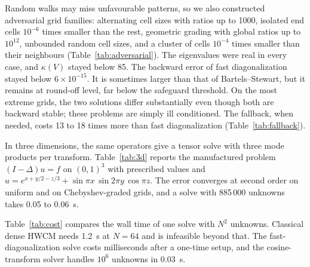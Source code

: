 \documentclass[preprint,12pt]{elsarticle}
\theoremstyle{remark}
\begin{document}
Random walks may miss unfavourable patterns, so we also constructed adversarial grid families:
alternating cell sizes with ratios up to 1000, isolated end cells $10^{-6}$ times smaller than the rest,
geometric grading with global ratios up to $10^{12}$, unbounded random cell sizes, and a cluster of cells
$10^{-4}$ times smaller than their neighbours (Table~\ref{tab:adversarial}). The eigenvalues were real in
every case, and $\kappa(V)$ stayed below 85. The backward error of fast diagonalization stayed below
$6\times10^{-15}$. It is sometimes larger than that of Bartels--Stewart, but it remains at round-off level,
far below the safeguard threshold. On the most extreme grids, the two solutions differ substantially even
though both are backward stable; these problems are simply ill conditioned. The fallback, when needed,
costs 13 to 18 times more than fast diagonalization (Table~\ref{tab:fallback}).

\begin{table}[t]\centering\small
\caption{Adversarial grid families ($N=256$): eigenvector conditioning, normwise backward errors of fast
diagonalization (FDM) and Bartels--Stewart (B--S), and relative difference of the two solutions.}\label{tab:adversarial}

\end{table}
\begin{table}[t]\centering\small
\caption{Cost of the safeguard: FDM including the backward-error check versus the Bartels--Stewart fallback,
on Chebyshev-graded grids (medians of repeated runs).}\label{tab:fallback}

\end{table}

In three dimensions, the same operators give a tensor solve with three mode products per transform.
Table~\ref{tab:3d} reports the manufactured problem $(I-\Delta)u=f$ on $(0,1)^3$ with prescribed values and
$u=e^{x+y/2-z/3}+\sin\pi x\,\sin2\pi y\,\cos\pi z$. The error converges at second order on uniform and on
Chebyshev-graded grids, and a solve with 885\,000 unknowns takes 0.05 to 0.06~s.

\begin{table}[t]\centering\small
\caption{Three-dimensional manufactured problem: maximum nodal error, observed rate and solve time.}\label{tab:3d}

\end{table}


Table~\ref{tab:cost} compares the wall time of one solve with $N^2$ unknowns. Classical dense HWCM
needs 1.2~s at $N=64$ and is infeasible beyond that. The fast-diagonalization solve costs milliseconds
after a one-time setup, and the cosine-transform solver handles $10^6$ unknowns in 0.03~s.
\end{document}
